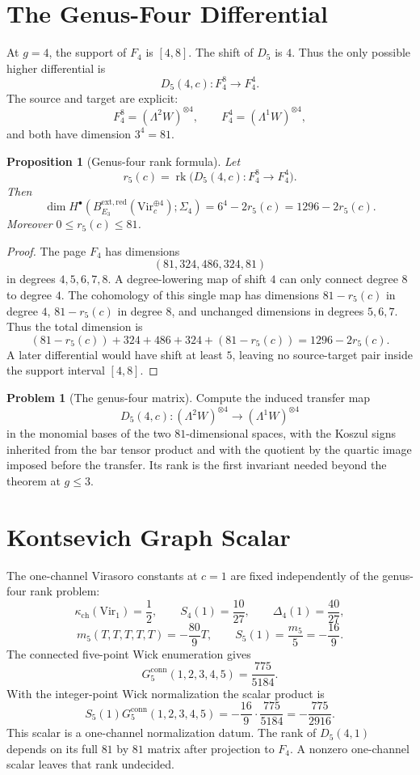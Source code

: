 \documentclass[11pt]{article}
\theoremstyle{plain}
\newtheorem{proposition}[theorem]{Proposition}
\theoremstyle{definition}
\newtheorem{problem}[theorem]{Problem}
\theoremstyle{remark}
\newcommand{\Vir}{\mathrm{Vir}}
\newcommand{\kch}{\kappa_{\mathrm{ch}}}
\newcommand{\Bext}{B_{E_3}^{\mathrm{ext,red}}}
\begin{document}
\section{The Genus-Four Differential}
\label{sec:genus-four}

At $g=4$, the support of $F_4$ is $[4,8]$. The shift of $D_5$ is $4$.
Thus the only possible higher differential is
\[
 D_5(4,c):F_4^8\longrightarrow F_4^4.
\]
The source and target are explicit:
\[
 F_4^8=(\Lambda^2W)^{\otimes 4},
 \qquad
 F_4^4=(\Lambda^1W)^{\otimes 4},
\]
and both have dimension $3^4=81$.

\begin{proposition}[Genus-four rank formula]
\label{prop:g4-rank-formula}
Let
\[
 r_5(c)=\operatorname{rk}\bigl(D_5(4,c):F_4^8\to F_4^4\bigr).
\]
Then
\[
 \dim H^\bullet(\Bext(\Vir_c^{\oplus 4});\Sigma_4)
 =6^4-2r_5(c)=1296-2r_5(c).
\]
Moreover $0\leq r_5(c)\leq 81$.
\end{proposition}

\begin{proof}
The page $F_4$ has dimensions
\[
 (81,324,486,324,81)
\]
in degrees $4,5,6,7,8$. A degree-lowering map of shift $4$ can only connect
degree $8$ to degree $4$. The cohomology of this single map has dimensions
$81-r_5(c)$ in degree $4$, $81-r_5(c)$ in degree $8$, and unchanged
dimensions in degrees $5,6,7$. Thus the total dimension is
\[
 (81-r_5(c))+324+486+324+(81-r_5(c))=1296-2r_5(c).
\]
A later differential would have shift at least $5$, leaving no source-target
pair inside the support interval $[4,8]$.
\end{proof}

\begin{problem}[The genus-four matrix]
\label{prob:g4-matrix}
Compute the induced transfer map
\[
 D_5(4,c):(\Lambda^2W)^{\otimes 4}\to(\Lambda^1W)^{\otimes 4}
\]
in the monomial bases of the two $81$-dimensional spaces, with the Koszul
signs inherited from the bar tensor product and with the quotient by the
quartic image imposed before the transfer. Its rank is the first invariant
needed beyond the theorem at $g\leq 3$.
\end{problem}

\section{Kontsevich Graph Scalar}
\label{sec:graph-scalar}

The one-channel Virasoro constants at $c=1$ are fixed independently of the
genus-four rank problem:
\[
 \kch(\Vir_1)=\frac12,\qquad S_4(1)=\frac{10}{27},\qquad
 \Delta_4(1)=\frac{40}{27},
\]
\[
 m_5(T,T,T,T,T)=-\frac{80}{9}T,\qquad S_5(1)=\frac{m_5}{5}=-\frac{16}{9}.
\]
The connected five-point Wick enumeration gives
\[
 G_5^{\mathrm{conn}}(1,2,3,4,5)=\frac{775}{5184}.
\]
With the integer-point Wick normalization the scalar product is
\[
 S_5(1)G_5^{\mathrm{conn}}(1,2,3,4,5)
 =-\frac{16}{9}\cdot\frac{775}{5184}
 =-\frac{775}{2916}.
\]
This scalar is a one-channel normalization datum. The rank of
$D_5(4,1)$ depends on its full $81$ by $81$ matrix after projection to
$F_4$. A nonzero one-channel scalar leaves that rank undecided.
\end{document}
